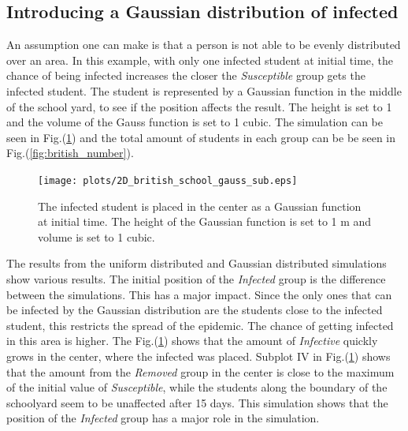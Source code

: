 \documentclass[%
twoside,                 %
final,                   %
10pt]{article}
\begin{document}
\noindent

\subsection{Introducing a Gaussian distribution of infected}
An assumption one can make is that a person is not able to be evenly distributed over an area. In this example, with only one infected student at initial time, the chance of being infected increases the closer the \emph{Susceptible} group gets the infected student. The student is represented by a Gaussian function in the middle of the school yard, to see if the position affects the result. The height is set to 1 and the volume of the Gauss function is set to 1 cubic. The simulation can be seen in Fig.(\ref{fig:gauss_sub}) and the total amount of students in each group can be be seen in Fig.(\ref{fig:british_number}).


\begin{figure}[ht]
  \centerline{\texttt{[image: plots/2D\_british\_school\_gauss\_sub.eps]}}
  \caption{
  \label{fig:gauss_sub} The infected student is placed in the center as a Gaussian function at initial time. The height of the Gaussian function is set to 1 m and volume is set to 1 cubic.
  }
\end{figure}




\vspace{3mm}




\vspace{3mm}


The results from the uniform distributed and Gaussian distributed simulations show various results. The initial position of the \emph{Infected} group is the difference between the simulations. This has a major impact. Since the only ones that can be infected by the Gaussian distribution are the students close to the infected student, this restricts the spread of the epidemic. The chance of getting infected in this area is higher. The Fig.(\ref{fig:gauss_sub}) shows that the amount of \emph{Infective} quickly grows in the center, where the infected was placed. Subplot IV in Fig.(\ref{fig:gauss_sub}) shows that the amount from the \emph{Removed} group in the center is close to the maximum of the initial value of \emph{Susceptible}, while the students along the boundary of the schoolyard seem to be unaffected after 15 days. This simulation shows that the position of the \emph{Infected} group has a major role in the simulation.
\end{document}
